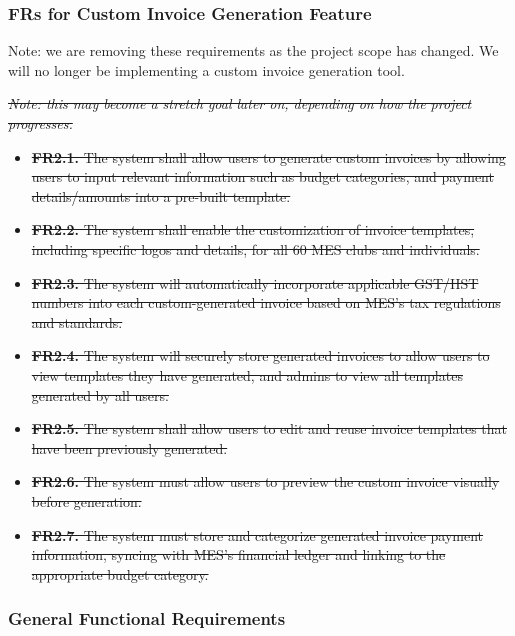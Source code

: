 \documentclass[12pt]{article}
\begin{document}
\subsubsection{FRs for Custom Invoice Generation Feature}

Note: we are removing these requirements as the project scope has changed. We will no longer be implementing a custom invoice generation tool.

\sout{\label{FRTwo}}

\sout{\textit{Note: this may become a stretch goal later on, depending on how the project progresses.}}

\begin{itemize}
    \item \sout{\textbf{FR2.1.} The system shall allow users to generate custom invoices by allowing users to input relevant information such as budget categories, and payment details/amounts into a pre-built template.}
    \item \sout{\textbf{FR2.2.} The system shall enable the customization of invoice templates, including specific logos and details, for all 60 MES clubs and individuals.}
    \item \sout{\textbf{FR2.3.} The system will automatically incorporate applicable GST/HST numbers into each custom-generated invoice based on MES's tax regulations and standards.}
    \item \sout{\textbf{FR2.4.} The system will securely store generated invoices to allow users to view templates they have generated, and admins to view all templates generated by all users.}
    \item \sout{\textbf{FR2.5.} The system shall allow users to edit and reuse invoice templates that have been previously generated.}
    \item \sout{\textbf{FR2.6.} The system must allow users to preview the custom invoice visually before generation.}
    \item \sout{\textbf{FR2.7.} The system must store and categorize generated invoice payment information, syncing with MES's financial ledger and linking to the appropriate budget category.}
\end{itemize}

\subsubsection{General Functional Requirements}

\label{FRThree}
\end{document}
